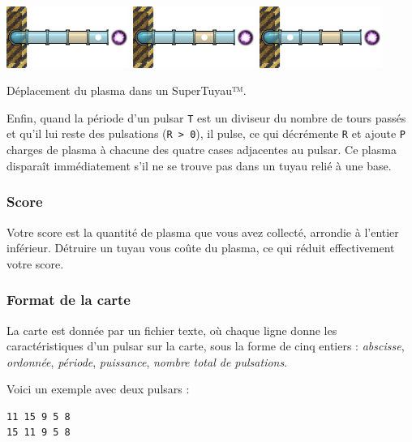 \noindent\includegraphics[width=0.3\textwidth]{asset/super_t0.png}\hfill
\includegraphics[width=0.3\textwidth]{asset/super_t1.png}\hfill
\includegraphics[width=0.3\textwidth]{asset/super_t2.png}

Déplacement du plasma dans un SuperTuyau™.


Enfin, quand la période d'un pulsar \texttt{T} est un diviseur du nombre
de tours passés et qu'il lui reste des pulsations
(\texttt{R\ \textgreater{}\ 0}), il pulse, ce qui décrémente \texttt{R}
et ajoute \texttt{P} charges de plasma à chacune des quatre cases
adjacentes au pulsar. Ce plasma disparaît immédiatement s'il ne se
trouve pas dans un tuyau relié à une base.

\subsubsection{Score}\label{score}

Votre score est la quantité de plasma que vous avez collecté, arrondie à
l'entier inférieur. Détruire un tuyau vous coûte du plasma, ce qui
réduit effectivement votre score.

\subsubsection{Format de la carte}\label{format-de-la-carte}

La carte est donnée par un fichier texte, où chaque ligne donne les
caractéristiques d'un pulsar sur la carte, sous la forme de cinq entiers
: \emph{abscisse}, \emph{ordonnée}, \emph{période}, \emph{puissance},
\emph{nombre total de pulsations}.

Voici un exemple avec deux pulsars :

\begin{verbatim}
11 15 9 5 8
15 11 9 5 8
\end{verbatim}
